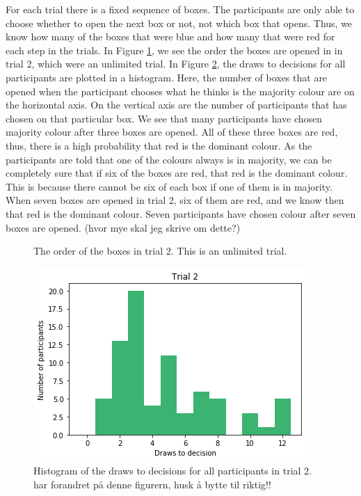 For each trial there is a fixed sequence of boxes. The participants are only able to choose whether to open the next box or not, not which box that opens. Thus, we know how many of the boxes that were blue and how many that were red for each step in the trials. In Figure \ref{fig:trial2_order}, we see the order the boxes are opened in in trial 2, which were an unlimited trial. In Figure \ref{fig:histogram_trial2}, the draws to decisions for all participants are plotted in a histogram. Here, the number of boxes that are opened when the participant chooses what he thinks is the majority colour are on the horizontal axis. On the vertical axis are the number of participants that has chosen on that particular box. We see that many participants have chosen majority colour after three boxes are opened. All of these three boxes are red, thus, there is a high probability that red is the dominant colour. 
As the participants are told that one of the colours always is in majority, we can be completely sure that if six of the boxes are red, that red is the dominant colour. This is because there cannot be six of each box if one of them is in majority. When seven boxes are opened in trial 2, six of them are red, and we know then that red is the dominant colour. Seven participants have chosen colour after seven boxes are opened. (hvor mye skal jeg skrive om dette?)
\begin{figure}
    \centering
    \scalebox{0.8}{}
    \caption[Order of boxes in trial 2]{The order of the boxes in trial 2. This is an unlimited trial.}
    \label{fig:trial2_order}
\end{figure}


\begin{figure}
    \centering
    \includegraphics[scale=0.6]{pictures/dtd2_histogram.png}
    \caption[Draws to decisions in trial 2]{Histogram of the draws to decisions for all participants in trial 2. 
    har forandret på denne figurern, husk å bytte til riktig!!}
    \label{fig:histogram_trial2}
\end{figure}


